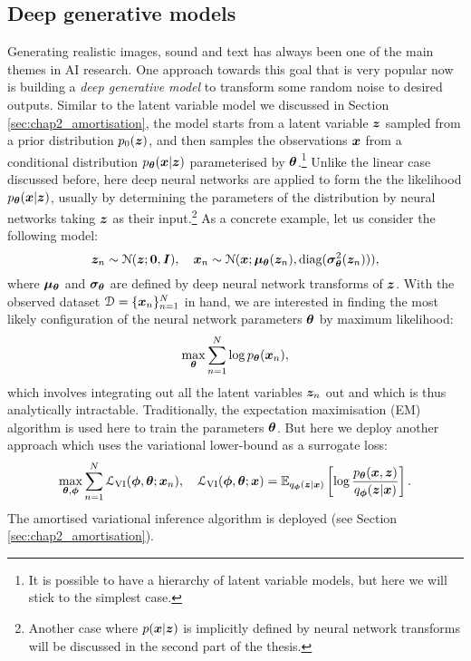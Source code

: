 \subsection{Deep generative models}
\label{sec:chap2_dgm}
Generating realistic images, sound and text has always been one of the main themes in AI research. One approach towards this goal that is very popular now is building a \emph{deep generative model} to transform some random noise to desired outputs. Similar to the latent variable model we discussed in Section \ref{sec:chap2_amortisation}, the model starts from a latent variable $\bm{z}$ sampled from a prior distribution $p_0(\bm{z})$, and then samples the observations $\bm{x}$ from a conditional distribution $p_{\bm{\theta}}(\bm{x} | \bm{z})$ parameterised by $\bm{\theta}$.\footnote{It is possible to have a hierarchy of latent variable models, but here we will stick to the simplest case.} Unlike the linear case discussed before, here deep neural networks are applied to form the the likelihood $p_{\bm{\theta}}(\bm{x} | \bm{z})$, usually by determining the parameters of the distribution by neural networks taking $\bm{z}$ as their input.\footnote{Another case where $p(\bm{x} | \bm{z})$ is implicitly defined by neural network transforms will be discussed in the second part of the thesis.} 
%
As a concrete example, let us consider the following model:
\begin{equation*}
\bm{z}_n \sim \mathcal{N}(\bm{z}; \bm{0}, \bm{I}), \quad \bm{x}_n \sim \mathcal{N}(\bm{x}; \bm{\mu}_{\bm{\theta}}(\bm{z}_n), \text{diag}(\bm{\sigma}^2_{\bm{\theta}}(\bm{z}_n) ) ),
\end{equation*}
where $\bm{\mu}_{\bm{\theta}}$ and $\bm{\sigma}_{\bm{\theta}}$ are defined by deep neural network transforms of $\bm{z}$. With the observed dataset $\mathcal{D} = \{ \bm{x}_n \}_{n=1}^N$ in hand, we are interested in finding the most likely configuration of the neural network parameters $\bm{\theta}$ by maximum likelihood:
\begin{equation}
\max_{\bm{\theta}} \sum_{n=1}^N \log p_{\bm{\theta}}(\bm{x}_n),
\end{equation} 
which involves integrating out all the latent variables $\bm{z}_n$ out and which is thus analytically intractable. Traditionally, the expectation maximisation (EM) algorithm \citep{dempster:em1977} is used here to train the parameters $\bm{\theta}$. But here we deploy another approach which uses the variational lower-bound as a surrogate loss:
\begin{equation}
\max_{\bm{\theta}, \bm{\phi}} \sum_{n=1}^N \mathcal{L}_{\text{VI}}(\bm{\phi}, \bm{\theta}; \bm{x}_n), \quad \mathcal{L}_{\text{VI}}(\bm{\phi}, \bm{\theta}; \bm{x}) = \mathbb{E}_{q_{\bm{\phi}}(\bm{z} | \bm{x})} \left[ \log \frac{p_{\bm{\theta}}(\bm{x}, \bm{z})}{q_{\bm{\phi}}(\bm{z}|\bm{x})} \right].
\end{equation}
The amortised variational inference algorithm is deployed (see Section \ref{sec:chap2_amortisation}). 

